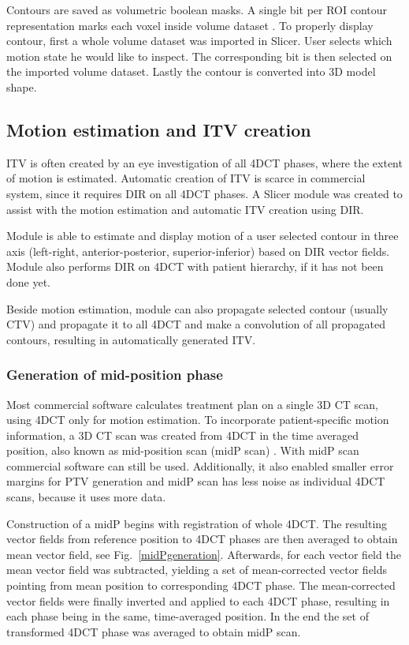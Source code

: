 \documentclass[type=dr, dr=rernat, accentcolor=tud7b,colorbacktitle, bigchapter, openright, twoside, 12pt ]{tudthesis}
\begin{document}
Contours are saved as volumetric boolean masks. A single bit per ROI contour representation marks each voxel inside volume dataset \cite{Richter2012}. To properly display contour, first a whole volume dataset was imported in Slicer. User selects which motion state he would like to inspect. The corresponding bit is then selected on the imported volume dataset. Lastly the contour is converted into 3D model shape. 

\subsection{Motion estimation and ITV creation}

ITV is often created by an eye investigation of all 4DCT phases, where the extent of motion is estimated. Automatic creation of ITV is scarce in commercial system, since it requires DIR on all 4DCT phases. A Slicer module was created to assist with the motion estimation and automatic ITV creation using DIR. 

Module is able to estimate and display motion of a user selected contour in three axis (left-right, anterior-posterior, superior-inferior) based on DIR vector fields. Module also performs DIR on 4DCT with patient hierarchy, if it has not been done yet.

Beside motion estimation, module can also propagate selected contour (usually CTV) and propagate it to all 4DCT and make a convolution of all propagated contours, resulting in automatically generated ITV.

\subsubsection{Generation of mid-position phase}

Most commercial software calculates treatment plan on a single 3D CT scan, using 4DCT only for motion estimation. To incorporate patient-specific motion information, a 3D CT scan was created from 4DCT in the time averaged position, also known as mid-position scan (midP scan) \cite{Wolthaus2008}. With midP scan commercial software can still be used. Additionally, it also enabled smaller error margins for PTV generation and midP scan has less noise as individual 4DCT scans, because it uses more data. 

Construction of a midP begins with registration of whole 4DCT. The resulting vector fields from reference position to 4DCT phases are then averaged to obtain mean vector field, see Fig.~\ref{midPgeneration}. Afterwards, for each vector field the mean vector field was subtracted, yielding a set of mean-corrected vector fields pointing from mean position to corresponding 4DCT phase. The mean-corrected vector fields were finally inverted and applied to each 4DCT phase, resulting in each phase being in the same, time-averaged position. In the end the set of transformed 4DCT phase was averaged to obtain midP scan.
\end{document}
